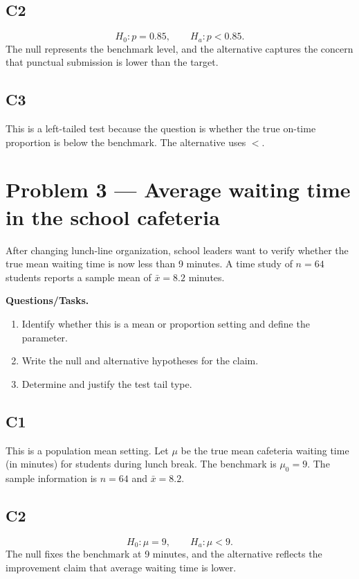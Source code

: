 	\subsection*{C2}
	\[
	H_0\colon p=0.85, \qquad H_a\colon p<0.85.
	\]
	The null represents the benchmark level, and the alternative captures the concern that punctual submission is lower than the target.
	
	\subsection*{C3}
	This is a left-tailed test because the question is whether the true on-time proportion is below the benchmark. The alternative uses \(<\).


	\section{Problem 3 --- Average waiting time in the school cafeteria}
	After changing lunch-line organization, school leaders want to verify whether the true mean waiting time is now less than 9 minutes. A time study of \(n=64\) students reports a sample mean of \(\bar{x}=8.2\) minutes.
	
	\textbf{Questions/Tasks.}
	\begin{enumerate}
		\item[(C1)] Identify whether this is a mean or proportion setting and define the parameter.
		\item[(C2)] Write the null and alternative hypotheses for the claim.
		\item[(C3)] Determine and justify the test tail type.
	\end{enumerate}
	
	\subsection*{C1}
	This is a population mean setting. Let \(\mu\) be the true mean cafeteria waiting time (in minutes) for students during lunch break. The benchmark is \(\mu_0=9\). The sample information is \(n=64\) and \(\bar{x}=8.2\).
	
	\subsection*{C2}
	\[
	H_0\colon \mu=9, \qquad H_a\colon \mu<9.
	\]
	The null fixes the benchmark at 9 minutes, and the alternative reflects the improvement claim that average waiting time is lower.
	

